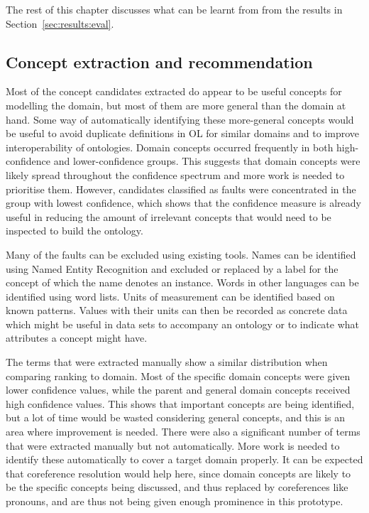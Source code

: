\documentclass[a4paper]{report}
\begin{document}
The rest of this chapter discusses what can be learnt from from the results in Section~\ref{sec:results:eval}.


\subsection{Concept extraction and recommendation}

Most of the concept candidates extracted do appear to be useful concepts for modelling the domain, but most of them are more general than the domain at hand.
Some way of automatically identifying these more-general concepts would be useful to avoid duplicate definitions in OL for similar domains and to improve interoperability of ontologies.
Domain concepts occurred frequently in both high-confidence and lower-confidence groups.
This suggests that domain concepts were likely spread throughout the confidence spectrum and more work is needed to prioritise them.
However, candidates classified as faults were concentrated in the group with lowest confidence, which shows that the confidence measure is already useful in reducing the amount of irrelevant concepts that would need to be inspected to build the ontology.

Many of the faults can be excluded using existing tools.
Names can be identified using Named Entity Recognition and excluded or replaced by a label for the concept of which the name denotes an instance.
Words in other languages can be identified using word lists.
Units of measurement can be identified based on known patterns.
Values with their units can then be recorded as concrete data which might be useful in data sets to accompany an ontology or to indicate what attributes a concept might have.

The terms that were extracted manually show a similar distribution when comparing ranking to domain.
Most of the specific domain concepts were given lower confidence values, while the parent and general domain concepts received high confidence values.
This shows that important concepts are being identified, but a lot of time would be wasted considering general concepts, and this is an area where improvement is needed.
There were also a significant number of terms that were extracted manually but not automatically.
More work is needed to identify these automatically to cover a target domain properly.
It can be expected that coreference resolution would help here, since domain concepts are likely to be the specific concepts being discussed, and thus replaced by coreferences like pronouns, and are thus not being given enough prominence in this prototype.
\end{document}

